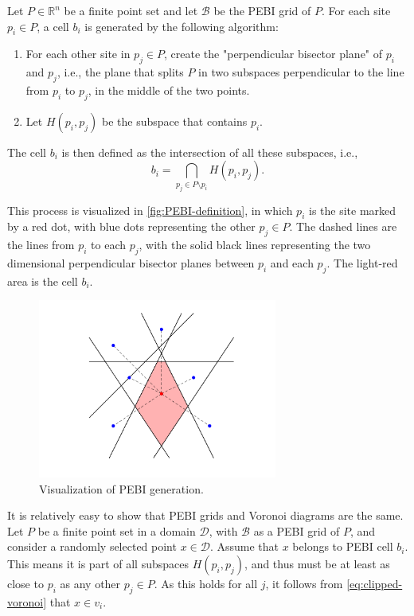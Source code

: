 \begin{definition}
\label{def:PEBI-grid}
Let $P\in \mathbb{R}^n$ be a finite point set and let $\mathcal{B}$ be the PEBI grid of $P$. For each site $p_i \in P$, a cell $b_i$ is generated by the following algorithm:
\begin{enumerate}
    \item For each other site in $p_j \in P$, create the "perpendicular bisector plane" of $p_i$ and $p_j$, i.e., the plane that splits $P$ in two subspaces perpendicular to the line from $p_i$ to $p_j$, in the middle of the two points.
    \item Let $H(p_i, p_j)$ be the subspace that contains $p_i$.
\end{enumerate}
The cell $b_i$ is then defined as the intersection of all these subspaces, i.e.,
\begin{equation}
    b_i = \bigcap_{p_j \in P \setminus p_i} H(p_i, p_j).
\end{equation}
\end{definition}

This process is visualized in \autoref{fig:PEBI-definition}, in which $p_i$ is the site marked by a red dot, with blue dots representing the other $p_j \in P$. The dashed lines are the lines from $p_i$ to each $p_j$, with the solid black lines representing the two dimensional perpendicular bisector planes between $p_i$ and each $p_j$. The light-red area is the cell $b_i$.

\begin{figure}[ht]
    \centering
    \includegraphics[width=0.7\textwidth]{report/Images/Theory/PEBI_definition.png}
    \caption{Visualization of PEBI generation.}
    \label{fig:PEBI-definition}
\end{figure}

It is relatively easy to show that PEBI grids and Voronoi diagrams are the same. Let $P$ be a finite point set in a domain $\mathcal{D}$, with $\mathcal{B}$ as a PEBI grid of $P$, and consider a randomly selected point $x \in \mathcal{D}$. Assume that $x$ belongs to PEBI cell $b_i$. This means it is part of all subspaces $H(p_i, p_j)$, and thus must be at least as close to $p_i$ as any other $p_j \in P$. As this holds for all $j$, it follows from \autoref{eq:clipped-voronoi} that $x \in v_i$.

